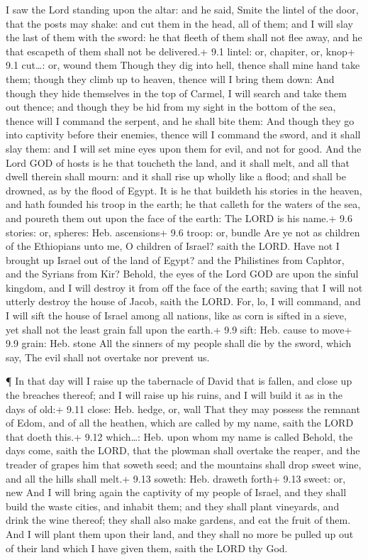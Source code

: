  I saw the Lord standing upon the altar: and he said, Smite
the lintel of the door, that the posts may shake: and cut them in the
head, all of them; and I will slay the last of them with the sword: he
that fleeth of them shall not flee away, and he that escapeth of them
shall not be delivered.+ 9.1 lintel: or, chapiter, or, knop+ 9.1
cut\ldots: or, wound them  Though they dig into hell, thence
shall mine hand take them; though they climb up to heaven, thence will I
bring them down:  And though they hide themselves in the top
of Carmel, I will search and take them out thence; and though they be
hid from my sight in the bottom of the sea, thence will I command the
serpent, and he shall bite them:  And though they go into
captivity before their enemies, thence will I command the sword, and it
shall slay them: and I will set mine eyes upon them for evil, and not
for good.  And the Lord GOD of hosts is he that toucheth the
land, and it shall melt, and all that dwell therein shall mourn: and it
shall rise up wholly like a flood; and shall be drowned, as by the flood
of Egypt.  It is he that buildeth his stories in the heaven,
and hath founded his troop in the earth; he that calleth for the waters
of the sea, and poureth them out upon the face of the earth: The LORD is
his name.+ 9.6 stories: or, spheres: Heb. ascensions+ 9.6 troop: or,
bundle  Are ye not as children of the Ethiopians unto me, O
children of Israel? saith the LORD. Have not I brought up Israel out of
the land of Egypt? and the Philistines from Caphtor, and the Syrians
from Kir?  Behold, the eyes of the Lord GOD are upon the
sinful kingdom, and I will destroy it from off the face of the earth;
saving that I will not utterly destroy the house of Jacob, saith the
LORD.  For, lo, I will command, and I will sift the house of
Israel among all nations, like as corn is sifted in a sieve, yet shall
not the least grain fall upon the earth.+ 9.9 sift: Heb. cause to move+
9.9 grain: Heb. stone  All the sinners of my people shall
die by the sword, which say, The evil shall not overtake nor prevent us.

 ¶ In that day will I raise up the tabernacle of David that
is fallen, and close up the breaches thereof; and I will raise up his
ruins, and I will build it as in the days of old:+ 9.11 close: Heb.
hedge, or, wall  That they may possess the remnant of Edom,
and of all the heathen, which are called by my name, saith the LORD that
doeth this.+ 9.12 which\ldots: Heb. upon whom my name is called
 Behold, the days come, saith the LORD, that the plowman
shall overtake the reaper, and the treader of grapes him that soweth
seed; and the mountains shall drop sweet wine, and all the hills shall
melt.+ 9.13 soweth: Heb. draweth forth+ 9.13 sweet: or, new
 And I will bring again the captivity of my people of
Israel, and they shall build the waste cities, and inhabit them; and
they shall plant vineyards, and drink the wine thereof; they shall also
make gardens, and eat the fruit of them.  And I will plant
them upon their land, and they shall no more be pulled up out of their
land which I have given them, saith the LORD thy God.
